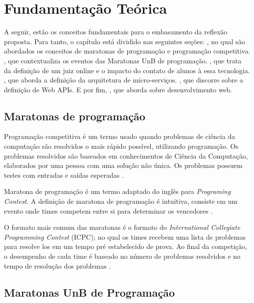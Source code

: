 \chapter[Fundamentação Teórica]{Fundamentação Teórica}
\label{chap:ft}

A seguir, estão os conceitos fundamentais para o embasamento da reflexão proposta. Para tanto, o capítulo está dividido nas seguintes seções: , no qual são abordados os conceitos de maratonas de programação e programação competitiva. 
, que contextualiza os eventos das Maratonas UnB de programação.
, que trata da definição de um juiz online e o impacto do contato de alunos à essa tecnologia.
, que aborda a definição da arquitetura de micro-serviços.
, que discorre sobre a definição de Web APIs. E por fim,
, que aborda sobre desenvolvimento web. 


\section{Maratonas de programação}
\label{sec:maratonasDeProgramação}

Programação competitiva é um termo usado quando problemas de ciência da computação são resolvidos o mais rápido possível, utilizando programação. Os problemas resolvidos são baseados em conhecimentos de Ciência da Computação, elaborados por uma pessoa com uma solução não única. Os problemas possuem testes com entradas e saídas esperadas \cite{halim2013competitive}.

Maratona de programação é um termo adaptado do inglês para \textit{Programing Contest}. A definição de maratona de programação é intuitiva, consiste em um evento onde times competem entre si para determinar os vencedores \cite{revilla2008competitive}. 

O formato mais comum das maratonas é o formato do \textit{International Collegiate Programming Contest} (ICPC); no qual os times recebem uma lista de problemas para resolve los em um tempo pré estabelecido de prova. Ao final da competição, o desempenho de cada time é baseado no número de problemas resolvidos e no tempo de resolução dos problemas \cite{aboutICPC}. 

\section{Maratonas UnB de Programação}
\label{sec:maratonasUnB}

